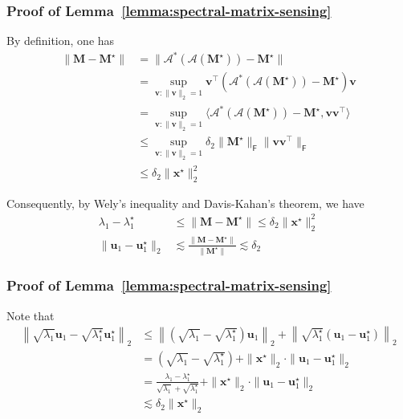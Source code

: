 \documentclass[compress,
mathserif,wide,%
]{beamer}
\begin{document}
\begin{frame}
	\frametitle{Proof of Lemma~\ref{lemma:spectral-matrix-sensing}}
	By definition, one has
	\begin{align*}
		\| \bm{M} - \bm{M}^\star \| &= \| \mathcal{A}^*( \mathcal{A} (\bm{M}^\star) ) - \bm{M}^\star \| \\
		 &= \sup_{\bm{v}: \|\bm{v}\|_2 = 1} \bm{v}^\top \left( \mathcal{A}^*( \mathcal{A} (\bm{M}^\star) ) - \bm{M}^\star \right) \bm{v} \\
		 &= \sup_{\bm{v}: \|\bm{v}\|_2 = 1} \langle  \mathcal{A}^*( \mathcal{A} (\bm{M}^\star) ) - \bm{M}^\star, \bm{v} \bm{v}^\top \rangle \\
		 &\leq \sup_{\bm{v}: \|\bm{v}\|_2 = 1} \delta_{2} \| \bm{M}^\star \|_{\mathsf{F}} \|\bm{v} \bm{v}^\top\|_{\mathsf{F}} \\
		 &\leq \delta_{2} \| \bm{x}^\star \|_2^2
	\end{align*}
	
	Consequently, by Wely's inequality and Davis-Kahan's theorem, we have
	\begin{align*}
		\lambda_1 - \lambda_1^\star & \leq \|\bm{M} - \bm{M}^\star \| \leq \delta_{2} \| \bm{x}^\star \|_2^2 \\
		\| \bm{u}_1 -  \bm{u}^\star_1 \|_{2} & \lesssim \frac{\|\bm{M} - \bm{M}^\star \|}{ \| \bm{M}^\star \| } \lesssim \delta_{2} 
	\end{align*}
\end{frame}

\begin{frame}
	\frametitle{Proof of Lemma~\ref{lemma:spectral-matrix-sensing}}
	Note that 
	\begin{align*}
		\left \| \sqrt{\lambda_1} \bm{u}_1 - \sqrt{\lambda_1^\star} \bm{u}^\star_1 \right \|_2  &\leq \left \| \left ( \sqrt{\lambda_1} - \sqrt{\lambda_1^\star} \right) \bm{u}_1  \right \|_2 + \left \| \sqrt{\lambda_1^\star} \left(  \bm{u}_1 -  \bm{u}^\star_1 \right) \right \|_2 \\
		&=  \left( \sqrt{\lambda_1} - \sqrt{\lambda_1^\star}  \right) + \| \bm{x}^\star \|_2 \cdot \| \bm{u}_1 -  \bm{u}^\star_1 \|_{2} \\
		&= \frac{ \lambda_1 - \lambda_1^\star }{ \sqrt{\lambda_1} + \sqrt{\lambda_1^\star} } + \| \bm{x}^\star \|_2 \cdot \| \bm{u}_1 -  \bm{u}^\star_1 \|_{2} \\
		&\lesssim \delta_{2} \|\bm{x}^\star\|_2
	\end{align*}
\end{frame}
\end{document}
